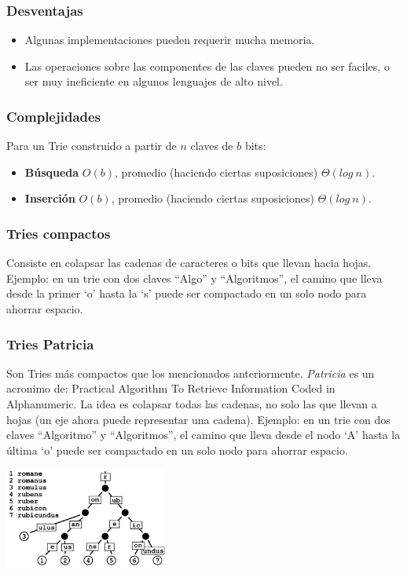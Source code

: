 \subsubsection{Desventajas}
\begin{itemize}
 \item Algunas implementaciones pueden requerir mucha memoria.
 \item Las operaciones sobre las componentes de las claves pueden no ser faciles, o ser muy ineficiente en algunos lenguajes de alto nivel.
\end{itemize}

\subsubsection{Complejidades}

Para un Trie construido a partir de $n$ claves de $b$ bits:

\begin{itemize}
 \item \textbf{B\'usqueda} $O(b)$, promedio (haciendo ciertas suposiciones) $\Theta(log\ n)$.
 \item \textbf{Inserci\'on} $O(b)$, promedio (haciendo ciertas suposiciones) $\Theta(log\ n)$.
\end{itemize}

\subsubsection{Tries compactos}
Consiste en colapsar las cadenas de caracteres o bits que llevan hacia hojas.
Ejemplo: en un trie con dos claves ``Algo'' y ``Algoritmos'', el camino que lleva desde la primer `o' hasta la `s' puede ser compactado en un solo nodo para ahorrar espacio.
\subsubsection{Tries Patricia}
Son Tries m\'as compactos que los mencionados anteriormente. \textit{Patricia} es un acronimo de: Practical Algorithm To Retrieve Information Coded in Alphanumeric.
La idea es colapsar todas las cadenas, no solo las que llevan a hojas (un eje ahora puede representar una cadena). 
Ejemplo: en un trie con dos claves ``Algoritmo'' y ``Algoritmos'', el camino que lleva desde el nodo `A' hasta la \'ultima `o' puede ser compactado en un solo nodo para ahorrar espacio.

\begin{center}
 \includegraphics[width=0.4\textwidth, height=0.3\textwidth]{./graficos/trie-patricia.png}
\end{center}

